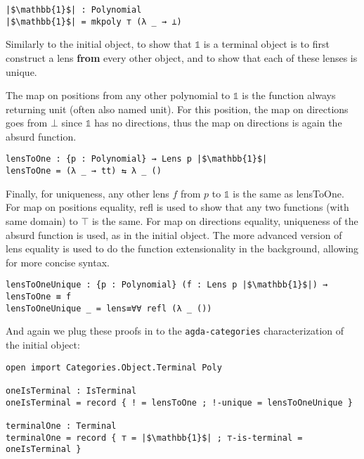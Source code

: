 \begin{verbatim}
|$\mathbb{1}$| : Polynomial
|$\mathbb{1}$| = mkpoly ⊤ (λ _ → ⊥)
\end{verbatim}

Similarly to the initial object, to show that $\mathbb{1}$ is a terminal object is to first construct a lens \textbf{from} every other object, and to show that each of these lenses is unique.

The map on positions from any other polynomial to $\mathbb{1}$ is the function always returning unit (often also named unit). For this position, the map on directions goes from $\bot$ since $\mathbb{1}$ has no directions, thus the map on directions is again the absurd function.

\begin{verbatim}
lensToOne : {p : Polynomial} → Lens p |$\mathbb{1}$|
lensToOne = (λ _ → tt) ⇆ λ _ ()
\end{verbatim}

Finally, for uniqueness, any other lens $f$ from $p$ to $\mathbb{1}$ is the same as lensToOne. For map on positions equality, refl is used to show that any two functions (with same domain) to $\top$ is the same. For map on directions equality, uniqueness of the absurd function is used, as in the initial object. The more advanced version of lens equality is used to do the function extensionality in the background, allowing for more concise syntax.

\begin{verbatim}
lensToOneUnique : {p : Polynomial} (f : Lens p |$\mathbb{1}$|) →  lensToOne ≡ f
lensToOneUnique _ = lens≡∀∀ refl (λ _ ())
\end{verbatim}

And again we plug these proofs in to the \texttt{agda-categories} characterization of the initial object:

\begin{verbatim}
open import Categories.Object.Terminal Poly

oneIsTerminal : IsTerminal
oneIsTerminal = record { ! = lensToOne ; !-unique = lensToOneUnique }

terminalOne : Terminal
terminalOne = record { ⊤ = |$\mathbb{1}$| ; ⊤-is-terminal = oneIsTerminal }
\end{verbatim}

